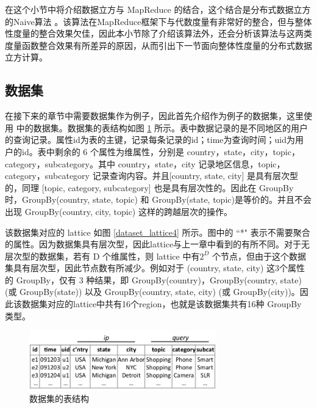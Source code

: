 
在这个小节中将介绍数据立方与 MapReduce 的结合，这个结合是分布式数据立方的Naive算法 \cite{nandi2011distributed}。该算法在MapReduce框架下与代数度量有非常好的整合，但与整体性度量的整合效果欠佳，因此本小节除了介绍该算法外，还会分析该算法与这两类度量函数整合效果有所差异的原因，从而引出下一节面向整体性度量的分布式数据立方计算。


\subsection{数据集}

在接下来的章节中需要数据集作为例子，因此首先介绍作为例子的数据集，这里使用\cite{nandi2011distributed}  中的数据集。数据集的表结构如图 \ref{dataset_table4} 所示。表中数据记录的是不同地区的用户的查询记录。属性id为表的主键，记录每条记录的id；time为查询时间；uid为用户的id。表中剩余的 6 个属性为维属性，分别是 country，state，city，topic，category，subcategory。其中 country，state，city 记录地区信息，topic，category，subcategory 记录查询内容。并且[country, state, city] 是具有层次型的，同理 [topic, category, subcategory] 也是具有层次性的。因此在 GroupBy 时，GroupBy(country, state, topic) 和 GroupBy(state, topic)是等价的。并且不会出现 GroupBy(country, city, topic) 这样的跨越层次的操作。

该数据集对应的 lattice 如图 \ref{dataset_lattice4} 所示。图中的 ``*" 表示不需要聚合的属性。因为数据集具有层次型，因此lattice与上一章中看到的有所不同。对于无层次型的数据集，若有 D 个维属性，则 lattice 中有${2}^{D}$ 个节点，但由于这个数据集具有层次型，因此节点数有所减少。例如对于 (country, state, city) 这3个属性的 GroupBy，仅有 3 种结果，即 GroupBy(country)，GroupBy(country, state) (或 GroupBy(state)) 以及 GroupBy(country, state, city) (或 GroupBy(city))。因此该数据集对应的lattice中共有16个region，也就是该数据集共有16种 GroupBy 类型。


\begin{figure}[!htb]
\centering\includegraphics[width=3.2in]{picture/ch_datacube_mr/dataset_table} 
\caption{数据集的表结构}\label{dataset_table4} 
\end{figure} 

